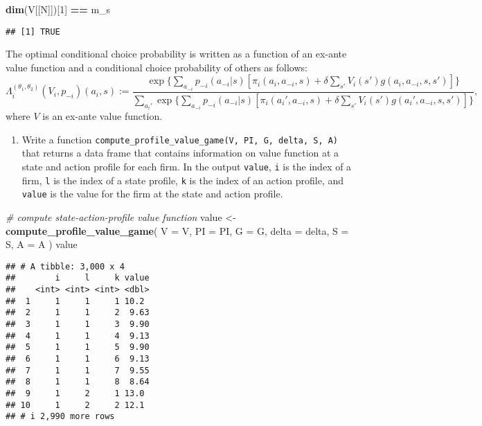 \documentclass[
]{book}
\newenvironment{Shaded}{\begin{snugshade}}{\end{snugshade}}
\newcommand{\AttributeTok}[1]{\textcolor[rgb]{0.13,0.29,0.53}{#1}}
\newcommand{\CommentTok}[1]{\textcolor[rgb]{0.56,0.35,0.01}{\textit{#1}}}
\newcommand{\DecValTok}[1]{\textcolor[rgb]{0.00,0.00,0.81}{#1}}
\newcommand{\FunctionTok}[1]{\textcolor[rgb]{0.13,0.29,0.53}{\textbf{#1}}}
\newcommand{\NormalTok}[1]{#1}
\newcommand{\OtherTok}[1]{\textcolor[rgb]{0.56,0.35,0.01}{#1}}
\newcommand{\SpecialCharTok}[1]{\textcolor[rgb]{0.81,0.36,0.00}{\textbf{#1}}}
\providecommand{\tightlist}{%
  \setlength{\itemsep}{0pt}\setlength{\parskip}{0pt}}
\begin{document}
\begin{Shaded}
\begin{Highlighting}[]
\FunctionTok{dim}\NormalTok{(V[[N]])[}\DecValTok{1}\NormalTok{] }\SpecialCharTok{==}\NormalTok{ m\_s}
\end{Highlighting}
\end{Shaded}

\begin{verbatim}
## [1] TRUE
\end{verbatim}

The optimal conditional choice probability is written as a function of an ex-ante value function and a conditional choice probability of others as follows:
\[
\Lambda_i^{(\theta_1, \theta_2)}(V_i, p_{-i})(a_i, s) := \frac{\exp\{\sum_{a_{-i}}p_{-i}(a_{-i}|s)[\pi_i(a_i, a_{-i}, s) + \delta \sum_{s'}V_i(s')g(a_i, a_{-i}, s, s')]\}}{\sum_{a_i'}\exp\{\sum_{a_{-i}}p_{-i}(a_{-i}|s)[\pi_i(a_i', a_{-i}, s) + \delta \sum_{s'}V_i(s')g(a_i', a_{-i}, s, s')]\}},
\]
where \(V\) is an ex-ante value function.

\begin{enumerate}
\def\labelenumi{\arabic{enumi}.}
\setcounter{enumi}{7}
\tightlist
\item
  Write a function \texttt{compute\_profile\_value\_game(V,\ PI,\ G,\ delta,\ S,\ A)} that returns a data frame that contains information on value function at a state and action profile for each firm. In the output \texttt{value}, \texttt{i} is the index of a firm, \texttt{l} is the index of a state profile, \texttt{k} is the index of an action profile, and \texttt{value} is the value for the firm at the state and action profile.
\end{enumerate}

\begin{Shaded}
\begin{Highlighting}[]
\CommentTok{\# compute state{-}action{-}profile value function}
\NormalTok{value }\OtherTok{\textless{}{-}} 
  \FunctionTok{compute\_profile\_value\_game}\NormalTok{(}
    \AttributeTok{V =}\NormalTok{ V, }
    \AttributeTok{PI =}\NormalTok{ PI,}
    \AttributeTok{G =}\NormalTok{ G, }
    \AttributeTok{delta =}\NormalTok{ delta, }
    \AttributeTok{S =}\NormalTok{ S, }
    \AttributeTok{A =}\NormalTok{ A}
\NormalTok{    )}
\NormalTok{value}
\end{Highlighting}
\end{Shaded}

\begin{verbatim}
## # A tibble: 3,000 x 4
##        i     l     k value
##    <int> <int> <int> <dbl>
##  1     1     1     1 10.2 
##  2     1     1     2  9.63
##  3     1     1     3  9.90
##  4     1     1     4  9.13
##  5     1     1     5  9.90
##  6     1     1     6  9.13
##  7     1     1     7  9.55
##  8     1     1     8  8.64
##  9     1     2     1 13.0 
## 10     1     2     2 12.1 
## # i 2,990 more rows
\end{verbatim}
\end{document}
